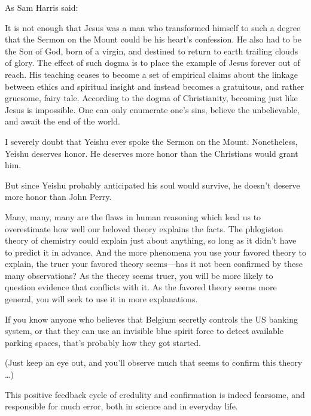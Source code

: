 {
 As Sam Harris said:}

{
 It is not enough that Jesus was a man who transformed himself to
such a degree that the Sermon on the Mount could be his
heart's confession. He also had to be the Son of God,
born of a virgin, and destined to return to earth trailing clouds of
glory. The effect of such dogma is to place the example of Jesus
forever out of reach. His teaching ceases to become a set of empirical
claims about the linkage between ethics and spiritual insight and
instead becomes a gratuitous, and rather gruesome, fairy tale.
According to the dogma of Christianity, becoming just like Jesus is
impossible. One can only enumerate one's sins, believe
the unbelievable, and await the end of the world.}

{
 I severely doubt that Yeishu ever spoke the Sermon on the Mount.
Nonetheless, Yeishu deserves honor. He deserves more honor than the
Christians would grant him.}

{
 But since Yeishu probably anticipated his soul would survive, he
doesn't deserve more honor than John Perry.}

\myendsectiontext


\bigskip


{
 Many, many, many are the flaws in human reasoning which lead us to
overestimate how well our beloved theory explains the facts. The
phlogiston theory of chemistry could explain just about anything, so
long as it didn't have to predict it in advance. And
the more phenomena you use your favored theory to explain, the truer
your favored theory seems---has it not been confirmed by these many
observations? As the theory seems truer, you will be more likely to
question evidence that conflicts with it. As the favored theory seems
more general, you will seek to use it in more explanations. }

{
 If you know anyone who believes that Belgium secretly controls the
US banking system, or that they can use an invisible blue spirit force
to detect available parking spaces, that's probably how
they got started.}

{
 (Just keep an eye out, and you'll observe much
that seems to confirm this theory \ldots)}

{
 This positive feedback cycle of credulity and confirmation is
indeed fearsome, and responsible for much error, both in science and in
everyday life.}

